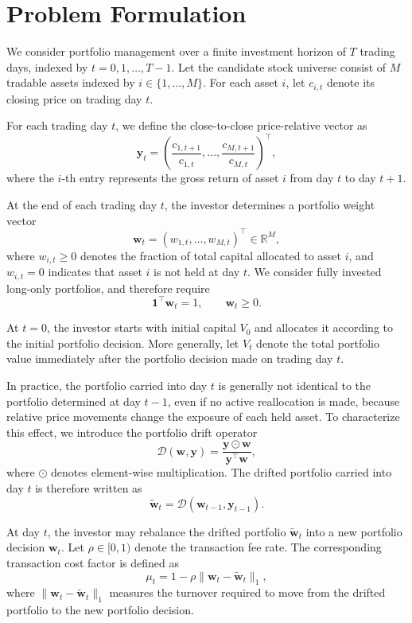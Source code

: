 \documentclass[letterpaper]{article} %
\begin{document}
\section{Problem Formulation}
We consider portfolio management over a finite investment horizon of $T$ trading days, indexed by $t=0,1,\dots,T-1$. Let the candidate stock universe consist of $M$ tradable assets indexed by $i\in\{1,\dots,M\}$. For each asset $i$, let $c_{i,t}$ denote its closing price on trading day $t$.

For each trading day $t$, we define the close-to-close price-relative vector as
\[
\mathbf{y}_t
=
\left(
\frac{c_{1,t+1}}{c_{1,t}},
\dots,
\frac{c_{M,t+1}}{c_{M,t}}
\right)^\top,
\]
where the $i$-th entry represents the gross return of asset $i$ from day $t$ to day $t+1$.

At the end of each trading day $t$, the investor determines a portfolio weight vector
\[
\mathbf{w}_t = (w_{1,t},\dots,w_{M,t})^\top \in \mathbb{R}^M,
\]
where $w_{i,t}\ge 0$ denotes the fraction of total capital allocated to asset $i$, and $w_{i,t}=0$ indicates that asset $i$ is not held at day $t$. We consider fully invested long-only portfolios, and therefore require
\[
\mathbf{1}^\top \mathbf{w}_t = 1,\qquad \mathbf{w}_t \ge 0.
\]

At $t=0$, the investor starts with initial capital $V_0$ and allocates it according to the initial portfolio decision. More generally, let $V_t$ denote the total portfolio value immediately after the portfolio decision made on trading day $t$.

In practice, the portfolio carried into day $t$ is generally not identical to the portfolio determined at day $t-1$, even if no active reallocation is made, because relative price movements change the exposure of each held asset. To characterize this effect, we introduce the portfolio drift operator
\[
\mathcal{D}(\mathbf{w},\mathbf{y})
=
\frac{\mathbf{y}\odot \mathbf{w}}{\mathbf{y}^\top \mathbf{w}},
\]
where $\odot$ denotes element-wise multiplication. The drifted portfolio carried into day $t$ is therefore written as
\[
\tilde{\mathbf{w}}_t
=
\mathcal{D}(\mathbf{w}_{t-1},\mathbf{y}_{t-1}).
\]

At day $t$, the investor may rebalance the drifted portfolio $\tilde{\mathbf{w}}_t$ into a new portfolio decision $\mathbf{w}_t$. Let $\rho\in[0,1)$ denote the transaction fee rate. The corresponding transaction cost factor is defined as
\[
\mu_t
=
1-\rho\|\mathbf{w}_t-\tilde{\mathbf{w}}_t\|_1,
\]
where $\|\mathbf{w}_t-\tilde{\mathbf{w}}_t\|_1$ measures the turnover required to move from the drifted portfolio to the new portfolio decision.
\end{document}
